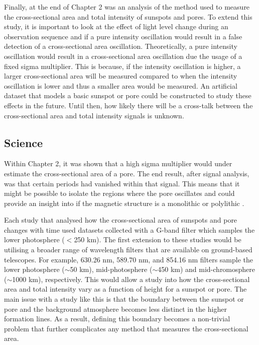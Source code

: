     Finally, at the end of Chapter 2 was an analysis of the method used to measure the cross-sectional area and total intensity of sunspots and pores.
    To extend this study, it is important to look at the effect of light level change during an observation sequence and if a pure intensity oscillation would result in a false detection of a cross-sectional area oscillation. 
    Theoretically, a pure intensity oscillation would result in a cross-sectional area oscillation due the usage of a fixed sigma multiplier.
    This is because, if the intensity oscillation is higher, a larger cross-sectional area will be measured compared to when the intensity oscillation is lower and thus a smaller area would be measured.
    An artificial dataset that models a basic sunspot or pore could be constructed to study these effects in the future.  
    Until then, how likely there will be a cross-talk between the cross-sectional area and total intensity signals is unknown.
                
    \subsection{Science}
 
	Within Chapter 2, it was shown that a high sigma multiplier would under estimate the cross-sectional area of a pore.
	The end result, after signal analysis, was that certain periods had vanished within that signal.
	This means that it might be possible to isolate the regions where the pore oscillates and could provide an insight into if the magnetic structure is a monolithic or polylithic \citep{1979ApJ...230..905P}.
 
    Each study that analysed how the cross-sectional area of sunspots and pore changes with time used datasets collected with a G-band filter which samples the lower photosphere ($<$250 km).
    The first extension to these studies would be utilising a broader range of wavelength filters that are available on ground-based telescopes.    
    For example,  630.26 nm,  589.70 nm, and  854.16 nm filters sample the lower photosphere ($\sim$50 km), mid-photosphere ($\sim$450 km) and mid-chromosphere ($\sim$1000 km), respectively.
    This would allow a study into how the cross-sectional area and total intensity vary as a function of height for a sunspot or pore. 
    The main issue with a study like this is that the boundary between the sunspot or pore and the background atmosphere becomes less distinct in the higher formation lines.
    As a result, defining this boundary becomes a non-trivial problem that further complicates any method that measures the cross-sectional area.

